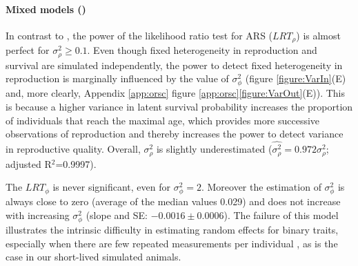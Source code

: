 \paragraph{Mixed models (\MM)}
In contrast to \NSM, the power of the likelihood ratio test for ARS ($LRT_{\rho}$) is almost perfect for $\sigma_{\rho}^2 \geq 0.1$. Even though fixed heterogeneity in reproduction and survival are simulated independently, the power to detect fixed heterogeneity in reproduction is marginally influenced by the value of $\sigma_{\phi}^2$ (figure \ref{figure:VarIn}(E) and, more clearly, Appendix \ref{app:orsc} figure \ref{app:orsc}\ref{figure:VarOut}(E)). This is because a higher variance in latent survival probability increases the proportion of individuals that reach the maximal age, which provides more successive observations of reproduction and thereby increases the power to detect variance in reproductive quality. Overall, $\sigma_{\rho}^2$ is slightly underestimated ($\hat{\sigma_{\rho}^2} = 0.972 \sigma_{\rho}^2$; adjusted R$^2$=0.9997).

The $LRT_\phi$ is never significant, even for $\sigma_{\phi}^2=2$. Moreover the estimation of $\sigma_{\phi}^2$ is always close to zero (average of the median values 0.029) and does not increase with increasing $\sigma_{\phi}^2$ (slope and SE: $-0.0016 \pm 0.0006$). The failure of this model illustrates the intrinsic difficulty in estimating random effects for binary traits, especially when there are few repeated measurements per individual \parencite[e.g.][chapter 9]{Albert1984,Hosmer2013}, as is the case in our short-lived simulated animals.

